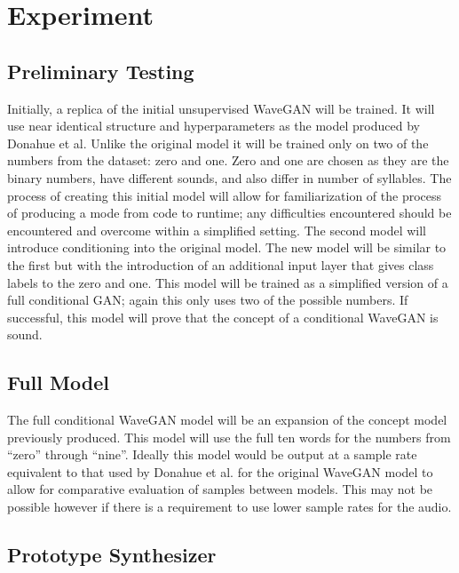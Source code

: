 \documentclass{article}
\begin{document}
\section{Experiment}

\subsection{Preliminary Testing}

Initially, a replica of the initial unsupervised WaveGAN will be trained.
It will use near identical structure and hyperparameters as the model produced by Donahue et al.
Unlike the original model it will be trained only on two of the numbers from the dataset: zero and one.
Zero and one are chosen as they are the binary numbers, have different sounds, and also differ in number of syllables.
The process of creating this initial model will allow for familiarization of the process of producing a mode from code to runtime; any difficulties encountered should be encountered and overcome within a simplified setting. 
\newline
\newline
The second model will introduce conditioning into the original model.
The new model will be similar to the first but with the introduction of an additional input layer that gives class labels to the zero and one.
This model will be trained as a simplified version of a full conditional GAN; again this only uses two of the possible numbers.
If successful, this model will prove that the concept of a conditional WaveGAN is sound.

\subsection{Full Model}

The full conditional WaveGAN model will be an expansion of the concept model previously produced.
This model will use the full ten words for the numbers from ``zero'' through ``nine''.
Ideally this model would be output at a sample rate equivalent to that used by Donahue et al. for the original WaveGAN model to allow for comparative evaluation of samples between models.
This may not be possible however if there is a requirement to use lower sample rates for the audio.

\subsection{Prototype Synthesizer}
\end{document}
